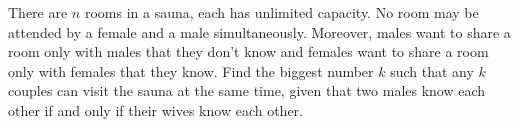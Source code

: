 There are $n$ rooms in a sauna, each has unlimited capacity. No room may be attended by a female and a male simultaneously. Moreover, males want to share a room only with males that they don't know and females want to share a room only with females that they know. Find the biggest number $k$ such that any $k$ couples can visit the sauna at the same time, given that two males know each other if and only if their wives know each other.